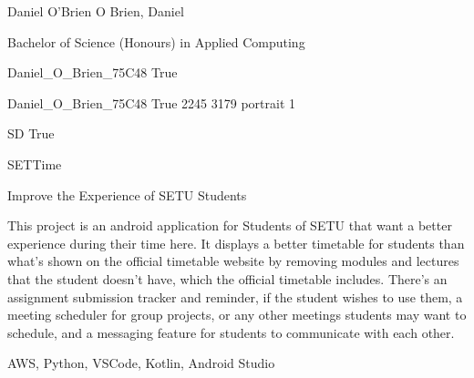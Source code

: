 
\begingroup{}\relax



\def\Key{Daniel_O_Brien_75C48}

{Daniel O'Brien}
{O Brien, Daniel}

{Bachelor of Science (Honours) in Applied Computing}

{Daniel_O_Brien_75C48}
{True}

{Daniel_O_Brien_75C48}
{True}
{2245}
{3179}
{portrait}
{1}

{SD}
{True}

{SETTime}

{Improve the Experience of SETU Students}

{This project is an android application for Students of SETU that want a better experience during their time here. It displays a better timetable for students than what's shown on the official timetable website by removing modules and lectures that the student doesn't have, which the official timetable includes. There's an assignment submission tracker and reminder, if the student wishes to use them, a meeting scheduler for group projects, or any other meetings students may want to schedule, and a messaging feature for students to communicate with each other.}

{AWS, Python, VSCode, Kotlin, Android Studio}

